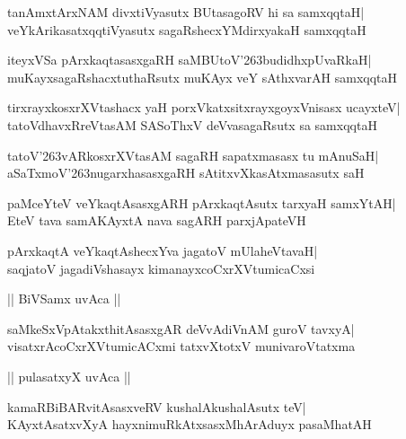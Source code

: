 \documentclass[twoside,12pt,openright]{book}
\def\S{\char'263}
\newcounter{shloka}[chapter]
\begin{document}
\begin{shloka}%
tanAmxtArxNAM divxtiVyasutx BUtasagoRV hi sa samxqqtaH|\\
veYkArikasatxqqtiVyasutx sagaRshecxYMdirxyakaH samxqqtaH
\end{shloka}

\begin{shloka}%
iteyxVSa pArxkaqtasasxgaRH saMBUtoV\S budidhxpUvaRkaH|\\
muKayxsagaRshacxtuthaRsutx muKAyx veY sAthxvarAH samxqqtaH
\end{shloka}

\begin{shloka}%
tirxrayxkosxrXVtashacx yaH porxVkatxsitxrayxgoyxVnisasx ucayxteV|\\
tatoVdhavxRreVtasAM SASoThxV deVvasagaRsutx sa samxqqtaH
\end{shloka}

\begin{shloka}%
tatoV\S vARkosxrXVtasAM sagaRH sapatxmasasx tu mAnuSaH|\\
aSaTxmoV\S nugarxhasasxgaRH sAtitxvXkasAtxmasasutx saH
\end{shloka}

\begin{shloka}%
paMceYteV veYkaqtAsasxgARH pArxkaqtAsutx tarxyaH samxYtAH|\\
EteV tava samAKAyxtA nava sagARH parxjApateVH
\end{shloka}

\begin{shloka}%
pArxkaqtA veYkaqtAshecxYva jagatoV mUlaheVtavaH|\\
saqjatoV jagadiVshasayx kimanayxcoCxrXVtumicaCxsi
\end{shloka}

\begin{center}
|| BiVSamx uvAca ||
\end{center}
\begin{shloka}%
saMkeSxVpAtakxthitAsasxgAR deVvAdiVnAM guroV tavxyA|\\
visatxrAcoCxrXVtumicACxmi tatxvXtotxV munivaroVtatxma
\end{shloka}

\begin{center}
|| pulasatxyX uvAca ||
\end{center}
\begin{shloka}%
kamaRBiBARvitAsasxveRV kushalAkushalAsutx teV|\\
KAyxtAsatxvXyA hayxnimuRkAtxsasxMhArAduyx pasaMhatAH
\end{shloka}
\end{document}

